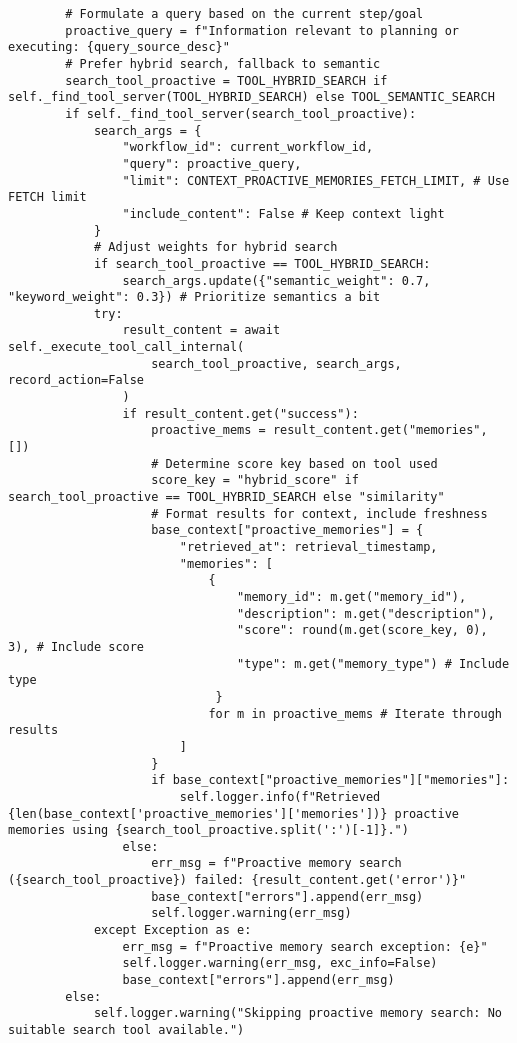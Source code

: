 \documentclass[12pt,a4paper]{article}
\begin{document}
\begin{pageablecode}
\begin{verbatim}
        # Formulate a query based on the current step/goal
        proactive_query = f"Information relevant to planning or executing: {query_source_desc}"
        # Prefer hybrid search, fallback to semantic
        search_tool_proactive = TOOL_HYBRID_SEARCH if self._find_tool_server(TOOL_HYBRID_SEARCH) else TOOL_SEMANTIC_SEARCH
        if self._find_tool_server(search_tool_proactive):
            search_args = {
                "workflow_id": current_workflow_id,
                "query": proactive_query,
                "limit": CONTEXT_PROACTIVE_MEMORIES_FETCH_LIMIT, # Use FETCH limit
                "include_content": False # Keep context light
            }
            # Adjust weights for hybrid search
            if search_tool_proactive == TOOL_HYBRID_SEARCH:
                search_args.update({"semantic_weight": 0.7, "keyword_weight": 0.3}) # Prioritize semantics a bit
            try:
                result_content = await self._execute_tool_call_internal(
                    search_tool_proactive, search_args, record_action=False
                )
                if result_content.get("success"):
                    proactive_mems = result_content.get("memories", [])
                    # Determine score key based on tool used
                    score_key = "hybrid_score" if search_tool_proactive == TOOL_HYBRID_SEARCH else "similarity"
                    # Format results for context, include freshness
                    base_context["proactive_memories"] = {
                        "retrieved_at": retrieval_timestamp,
                        "memories": [
                            {
                                "memory_id": m.get("memory_id"),
                                "description": m.get("description"),
                                "score": round(m.get(score_key, 0), 3), # Include score
                                "type": m.get("memory_type") # Include type
                             }
                            for m in proactive_mems # Iterate through results
                        ]
                    }
                    if base_context["proactive_memories"]["memories"]:
                        self.logger.info(f"Retrieved {len(base_context['proactive_memories']['memories'])} proactive memories using {search_tool_proactive.split(':')[-1]}.")
                else:
                    err_msg = f"Proactive memory search ({search_tool_proactive}) failed: {result_content.get('error')}"
                    base_context["errors"].append(err_msg)
                    self.logger.warning(err_msg)
            except Exception as e:
                err_msg = f"Proactive memory search exception: {e}"
                self.logger.warning(err_msg, exc_info=False)
                base_context["errors"].append(err_msg)
        else:
            self.logger.warning("Skipping proactive memory search: No suitable search tool available.")


\end{verbatim}
\end{pageablecode}
\end{document}
